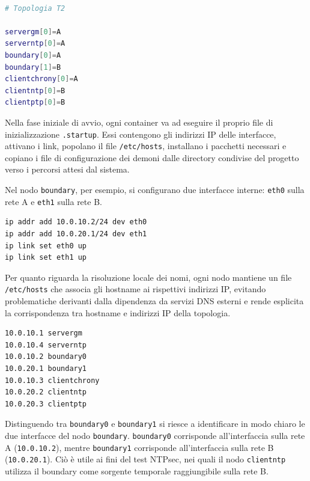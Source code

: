 \begin{lstlisting}[language=bash,caption={Estratto del file \texttt{lab.conf}: assegnazione dei nodi alle reti A e B.},label={lst:labconf_topologia}]

# Topologia T2

servergm[0]=A
serverntp[0]=A
boundary[0]=A
boundary[1]=B
clientchrony[0]=A
clientntp[0]=B
clientptp[0]=B
\end{lstlisting}

Nella fase iniziale di avvio, ogni container va ad eseguire il proprio file di inizializzazione
\texttt{.startup}. Essi contengono gli indirizzi IP delle interfacce, attivano i
link, popolano il file \texttt{/etc/hosts}, installano i pacchetti necessari e copiano
i file di configurazione dei demoni dalle directory condivise del progetto verso i
percorsi attesi dal sistema.

Nel nodo \texttt{boundary}, per esempio, si configurano due interfacce interne: \texttt{eth0}
sulla rete A e \texttt{eth1} sulla rete B.

\begin{lstlisting}[language=bash,caption={Estratto di \texttt{boundary.startup}: configurazione delle interfacce interne.},label={lst:boundary_startup_ip}]
ip addr add 10.0.10.2/24 dev eth0
ip addr add 10.0.20.1/24 dev eth1
ip link set eth0 up
ip link set eth1 up
\end{lstlisting}

Per quanto riguarda la risoluzione locale dei nomi, ogni nodo mantiene un file \texttt{/etc/hosts}
che associa gli hostname ai rispettivi indirizzi IP, evitando problematiche derivanti
dalla dipendenza da servizi DNS esterni e rende esplicita la corrispondenza tra hostname
e indirizzi IP della topologia.

\begin{lstlisting}[language=bash,caption={Mappatura locale degli hostname nei container.},label={lst:hosts_mapping}]
10.0.10.1 servergm
10.0.10.4 serverntp
10.0.10.2 boundary0
10.0.20.1 boundary1
10.0.10.3 clientchrony
10.0.20.2 clientntp
10.0.20.3 clientptp
\end{lstlisting}

Distinguendo tra \texttt{boundary0} e \texttt{boundary1} si riesce a
identificare in modo chiaro le due interfacce del nodo \texttt{boundary}.
\texttt{boundary0} corrisponde all'interfaccia sulla rete A (\texttt{10.0.10.2}),
mentre \texttt{boundary1} corrisponde all'interfaccia sulla rete B (\texttt{10.0.20.1}).
Ciò è utile ai fini del test NTPsec, nei quali il nodo \texttt{clientntp}
utilizza il boundary come sorgente temporale raggiungibile sulla rete B.

